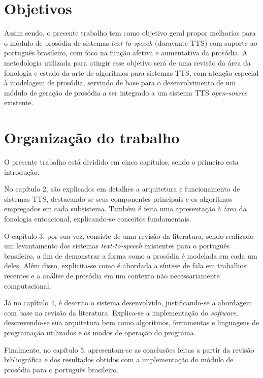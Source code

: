 \section{Objetivos}
Assim sendo, o presente trabalho tem como objetivo geral propor melhorias para o
módulo de prosódia de sistemas \emph{text-to-speech} (doravante TTS)
com suporte ao português brasileiro, com foco na função afetiva e aumentativa da
prosódia. A metodologia utilizada para atingir esse objetivo será de uma revisão
da área da fonologia e estado da arte de algoritmos para sistemas TTS, com
atenção especial à modelagem de prosódia, servindo de base para o
desenvolvimento de um módulo de geração de prosódia a ser integrado a um sistema
TTS \emph{open-source} existente.

\section{Organização do trabalho}
O presente trabalho está dividido em cinco capítulos, sendo o primeiro esta introdução.

No capítulo 2, são explicados em detalhes a arquitetura e funcionamento de sistemas
TTS, destacando-se seus componentes principais e os algoritmos empregados em cada
subsistema. Também é feita uma apresentação à área da fonologia entoacional,
explicando-se conceitos fundamentais.


O capítulo 3, por sua vez, consiste de uma revisão da literatura, sendo
realizado um levantamento dos sistemas \emph{text-to-speech} existentes para o
português brasileiro, a fim de demonstrar a forma como a prosódia é modelada em
cada um deles. Além disso, explicita-se como é abordada a síntese de fala em
trabalhos recentes e a análise de prosódia em um contexto não necessariamente
computacional.

Já no capítulo 4, é descrito o sistema desenvolvido, justificando-se a
abordagem com base na revisão da literatura. Explica-se a implementação do
\emph{software}, descrevendo-se sua arquitetura bem como algoritmos,
ferramentas e linguagens de programação utilizados e os modos de operação do
programa.

Finalmente, no capítulo 5, apresentam-se as conclusões feitas a partir da revisão
bibliográfica e dos resultados obtidos com a implementação do módulo de prosódia
para o português brasileiro.
